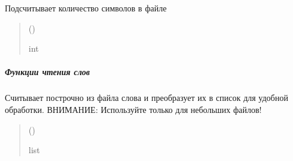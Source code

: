 \documentclass[a4paper,11pt,russian,openany,oneside]{sphinxmanual}
\begin{document}
\begin{savenotes}\begin{fulllineitems}
\label{\detokenize{scan_module:scan_module.read_files.count_characters_in_file}}
\pysigstartsignatures
\pysiglinewithargsret
{}
{}
{}
\pysigstopsignatures
\sphinxAtStartPar
Подсчитывает количество символов в файле
\begin{quote}\begin{description}
\sphinxAtStartPar
{} ()

\sphinxAtStartPar
int

\end{description}\end{quote}

\end{fulllineitems}\end{savenotes}



\subparagraph{Функции чтения слов}
\label{\detokenize{scan_module:id2}}

\begin{savenotes}\begin{fulllineitems}
\label{\detokenize{scan_module:id0}}
\pysigstartsignatures
\pysiglinewithargsret
{}
{}
{}
\pysigstopsignatures
\sphinxAtStartPar
Считывает построчно из файла слова и преобразует
их в список для удобной обработки.
ВНИМАНИЕ: Используйте только для небольших файлов!
\begin{quote}\begin{description}
\sphinxAtStartPar
{} ()

\sphinxAtStartPar
list

\end{description}\end{quote}

\end{fulllineitems}\end{savenotes}
\end{document}
